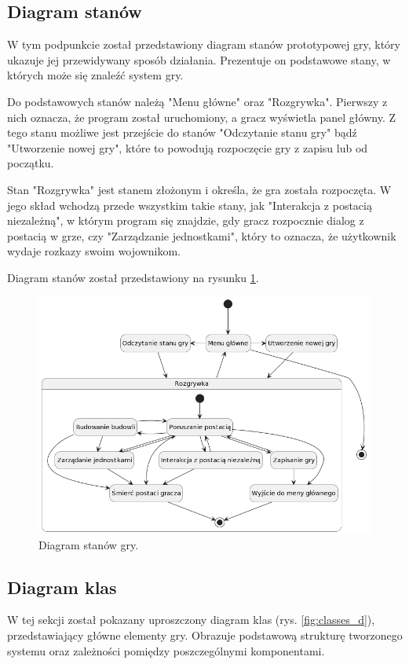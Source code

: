 \subsection{Diagram stanów}\label{ss:state}
W tym podpunkcie został przedstawiony diagram stanów prototypowej gry, który ukazuje jej przewidywany sposób działania.
Prezentuje on podstawowe stany, w których może się znaleźć system gry.

Do podstawowych stanów należą "Menu główne" oraz "Rozgrywka". Pierwszy z nich oznacza, że program został uruchomiony, a
gracz wyświetla panel główny. Z tego stanu możliwe jest przejście do stanów "Odczytanie stanu gry" bądź "Utworzenie
nowej gry", które to powodują rozpoczęcie gry z zapisu lub od początku.

Stan "Rozgrywka" jest stanem złożonym i określa, że gra została rozpoczęta. W jego skład wchodzą przede wszystkim takie
stany, jak "Interakcja z postacią niezależną", w którym program się znajdzie, gdy gracz rozpocznie dialog z postacią w grze,
czy "Zarządzanie jednostkami", który to oznacza, że użytkownik wydaje rozkazy swoim wojownikom.

Diagram stanów został przedstawiony na rysunku \ref{fig:states_d}.

\begin{figure}[!htbp]
    \centering
    \includegraphics[width=1.0\textwidth]{images/diagrams/state.jpg}
    \caption{Diagram stanów gry.}\label{fig:states_d}
\end{figure}
\FloatBarrier

\subsection{Diagram klas}\label{ss:class}
W tej sekcji został pokazany uproszczony diagram klas (rys. \ref{fig:classes_d}), przedstawiający główne elementy gry.
Obrazuje podstawową strukturę tworzonego systemu oraz zależności pomiędzy poszczególnymi komponentami.

